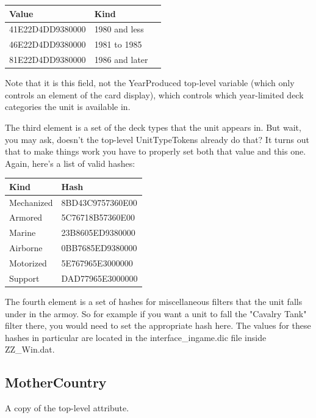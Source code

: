 \documentclass{article}
\begin{document}
\begin{center}
    \begin{tabular}{ | l | l | l |}
    \hline
	Value & Kind\\ \hline
41E22D4DD9380000 & 1980 and less\\
46E22D4DD9380000 & 1981 to 1985\\
81E22D4DD9380000 & 1986 and later\\
    \hline
    \end{tabular}
\end{center}

Note that it is this field, not the YearProduced top-level variable (which only controls an element of the card display), which controls which year-limited deck categories the unit is available in.

The third element is a set of the deck types that the unit appears in. But wait, you may ask, doesn't the top-level UnitTypeTokens already do that? It turns out that to make things work you have to properly set both that value and this one. Again, here's a list of valid hashes:

\begin{center}
    \begin{tabular}{ | l | l |}
    \hline
	Kind & Hash\\ \hline
	Mechanized & 8BD43C9757360E00\\
	Armored & 5C76718B57360E00\\
	Marine & 23B8605ED9380000\\
	Airborne & 0BB7685ED9380000\\
	Motorized & 5E767965E3000000\\
	Support & DAD77965E3000000\\
    \hline
    \end{tabular}
\end{center}

The fourth element is a set of hashes for miscellaneous filters that the unit falls under in the armoy. So for example if you want a unit to fall the "Cavalry Tank" filter there, you would need to set the appropriate hash here. The values for these hashes in particular are located in the interface\_ingame.dic file inside ZZ\_Win.dat.

\subsection{MotherCountry}

A copy of the top-level attribute.
\end{document}
